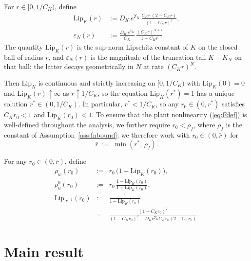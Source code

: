 \documentclass[amsthm]{autart}
\theoremstyle{plain}
\theoremstyle{definition}
\newcommand{\Tcal}{\mathcal{T}}
\newcommand{\Lipk}{\mathrm{Lip}_K}
\newcommand{\LipT}{\mathrm{Lip}_{\Tcal^{-1}}}
\newcommand{\eps}{\varepsilon}
\begin{document}
For $r \in [0, 1/C_K)$, define
\begin{align}
\Lipk(r) &:= D_K\, e^{\Upsilon_K}\, \frac{C_K r\,(2 - C_K r)}{(1 - C_K r)^2}, \label{eq:LipKdef}\\
\eps_N(r) &:= \frac{D_K\, e^{\Upsilon_K}}{C_K}\, \frac{(C_K r)^{N+1}}{1 - C_K r}.
\label{eq:epsNdef}
\end{align}
The quantity $\Lipk(r)$ is the sup-norm Lipschitz constant of $K$ on the closed ball of radius $r$, and $\eps_N(r)$ is the magnitude of the truncation tail $K - K_N$ on that ball; the latter decays geometrically in $N$ at rate $(C_K r)^N$.

Then $\Lipk$ is continuous and strictly increasing on $[0, 1/C_K)$ with $\Lipk(0) = 0$ and $\Lipk(r) \uparrow \infty$ as $r \uparrow 1/C_K$, so the equation $\Lipk(r^*) = 1$ has a unique solution $r^* \in (0, 1/C_K)$. In particular, $r^* < 1/C_K$, so any $r_0 \in (0, r^*)$ satisfies $C_K r_0 < 1$ and $\Lipk(r_0) < 1$. To ensure that the plant nonlinearity (\ref{eq:Fdef}) is well-defined throughout the analysis, we further require $r_0 < \rho_f$, where $\rho_f$ is the constant of Assumption~\ref{ass:fnbound}; we therefore work with $r_0 \in (0, \bar r)$ for
\begin{equation}
\bar r \;:=\; \min(r^*,\, \rho_f).
\label{eq:rbardef}
\end{equation}

For any $r_0 \in (0, \bar r)$, define
\begin{eqnarray}
\rho_w(r_0) &:=& r_0\,\bigl(1 - \Lipk(r_0)\bigr), \label{eq:rhowdef}\\
\rho_u^0(r_0) &:=& r_0\,\frac{1 - \Lipk(r_0)}{1 + \Lipk(r_0)}, \label{eq:rhou0def}\\
\LipT(r_0) &:=& \frac{1}{1 - \Lipk(r_0)} \nonumber \\
&=& \frac{(1-C_K r_0)^2}{(1-C_K r_0)^2 - D_K e^{\Upsilon_K} C_K r_0 (2 - C_K r_0)}.
\label{eq:LipTinvdef}
\end{eqnarray}

\section{Main result}\label{sec:mainresult}
\end{document}

